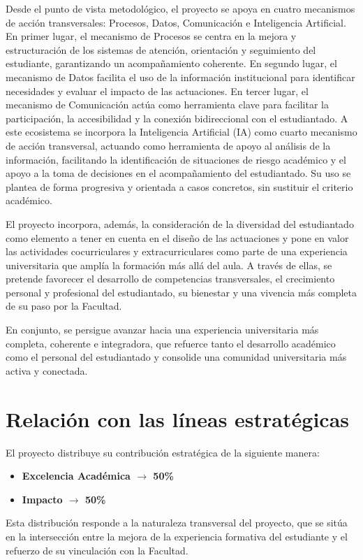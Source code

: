 \documentclass[11pt,a4paper]{scrreprt}
\begin{document}
Desde el punto de vista metodológico, el proyecto se apoya en cuatro mecanismos de acción transversales: Procesos, Datos, Comunicación e Inteligencia Artificial. En primer lugar, el mecanismo de Procesos se centra en la mejora y estructuración de los sistemas de atención, orientación y seguimiento del estudiante, garantizando un acompañamiento coherente. En segundo lugar, el mecanismo de Datos facilita el uso de la información institucional para identificar necesidades y evaluar el impacto de las actuaciones. En tercer lugar, el mecanismo de Comunicación actúa como herramienta clave para facilitar la participación, la accesibilidad y la conexión bidireccional con el estudiantado. A este ecosistema se incorpora la Inteligencia Artificial (IA) como cuarto mecanismo de acción transversal, actuando como herramienta de apoyo al análisis de la información, facilitando la identificación de situaciones de riesgo académico y el apoyo a la toma de decisiones en el acompañamiento del estudiantado. Su uso se plantea de forma progresiva y orientada a casos concretos, sin sustituir el criterio académico.

El proyecto incorpora, además, la consideración de la diversidad del estudiantado como elemento a tener en cuenta en el diseño de las actuaciones y pone en valor las actividades cocurriculares y extracurriculares como parte de una experiencia universitaria que amplía la formación más allá del aula. A través de ellas, se pretende favorecer el desarrollo de competencias transversales, el crecimiento personal y profesional del estudiantado, su bienestar y una vivencia más completa de su paso por la Facultad.

En conjunto, se persigue avanzar hacia una experiencia universitaria más completa, coherente e integradora, que refuerce tanto el desarrollo académico como el personal del estudiantado y consolide una comunidad universitaria más activa y conectada.

\section{Relación con las líneas estratégicas}

\small
El proyecto distribuye su contribución estratégica de la siguiente manera:

\begin{itemize}[noitemsep,topsep=2pt]
\item \textbf{Excelencia Académica $\rightarrow$ 50\%}
\item \textbf{Impacto $\rightarrow$ 50\%}
\end{itemize}
Esta distribución responde a la naturaleza transversal del proyecto, que se sitúa en la intersección entre la mejora de la experiencia formativa del estudiante y el refuerzo de su vinculación con la Facultad.
\end{document}
